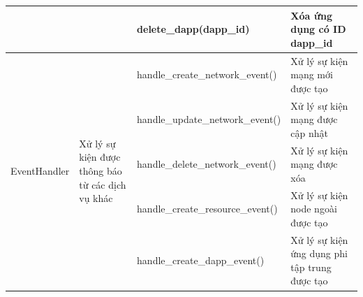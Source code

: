 \documentclass[../DoAn.tex]{subfiles}
\begin{document}
\begin{longtable}{|p{}|p{}|p{}|p{}|}
                                                 &                                                                                  & \hspace{0pt}delete\_dapp\hspace{0pt}(dapp\_id)                                    & Xóa ứng dụng có ID dapp\_id                                                                  \\ \hline
    \multirow[t]{7}{0.2\textwidth}{EventHandler} & \multirow[t]{7}{0.2\textwidth}{Xử lý sự kiện được thông báo từ các dịch vụ khác} & \hspace{0pt}handle\_\hspace{0pt}create\_\hspace{0pt}network\_\hspace{0pt}event()  & Xử lý sự kiện mạng mới được tạo                                                              \\ \cline{3-4}
                                                 &                                                                                  & \hspace{0pt}handle\_\hspace{0pt}update\_\hspace{0pt}network\_\hspace{0pt}event()  & Xử lý sự kiện mạng được cập nhật                                                             \\ \cline{3-4}
                                                 &                                                                                  & \hspace{0pt}handle\_\hspace{0pt}delete\_\hspace{0pt}network\_\hspace{0pt}event()  & Xử lý sự kiện mạng được xóa                                                                  \\ \cline{3-4}
                                                 &                                                                                  & \hspace{0pt}handle\_\hspace{0pt}create\_\hspace{0pt}resource\_\hspace{0pt}event() & Xử lý sự kiện node ngoài được tạo                                                            \\ \cline{3-4}
                                                 &                                                                                  & \hspace{0pt}handle\_\hspace{0pt}create\_\hspace{0pt}dapp\_\hspace{0pt}event()     & Xử lý sự kiện ứng dụng phi tập trung được tạo                                                \\ \hline

\end{longtable}
\end{document}
